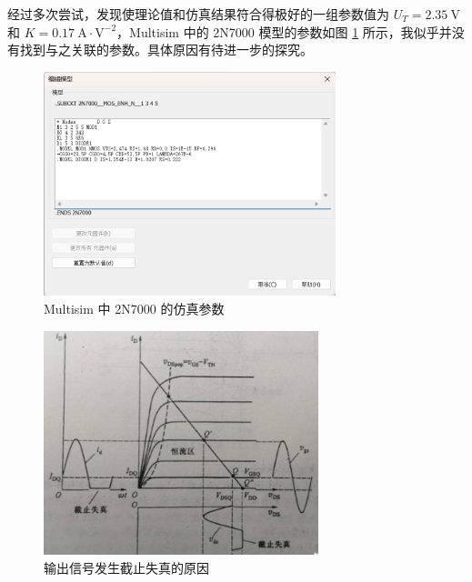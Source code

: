 \documentclass[UTF8]{report}
\theoremstyle{MyLineTheoremStyle} %
\theoremstyle{MyBlockTheoremStyle} %
\theoremstyle{MySubsubsectionStyle} %
\begin{document}
经过多次尝试，发现使理论值和仿真结果符合得极好的一组参数值为 $U_T = 2.35 \ \mathrm{V}$ 和 $K = 0.17 \ \mathrm{A\cdot V^{-2}}$，Multisim 中的 2N7000 模型的参数如图 \ref{仿真参数} 所示，我似乎并没有找到与之关联的参数。具体原因有待进一步的探究。

\begin{center}
\noindent\begin{minipage}{0.49\columnwidth}
\begin{figure}[H]\centering
\includegraphics[height=185pt]{assets/Sim2/fcec710ef28b194ff2d459dd7e07c648.png}
\caption{Multisim 中 2N7000 的仿真参数}\label{仿真参数}
\end{figure}
\end{minipage}\hfill\begin{minipage}{0.49\columnwidth}
\begin{figure}[H]\centering
    \includegraphics[height=185pt]{assets/Sim2/226356f87631e83464cfbf9c4f6e9141.png}
    \caption{输出信号发生截止失真的原因}\label{截止失真}
\end{figure}
\end{minipage}\end{center}
\end{document}
